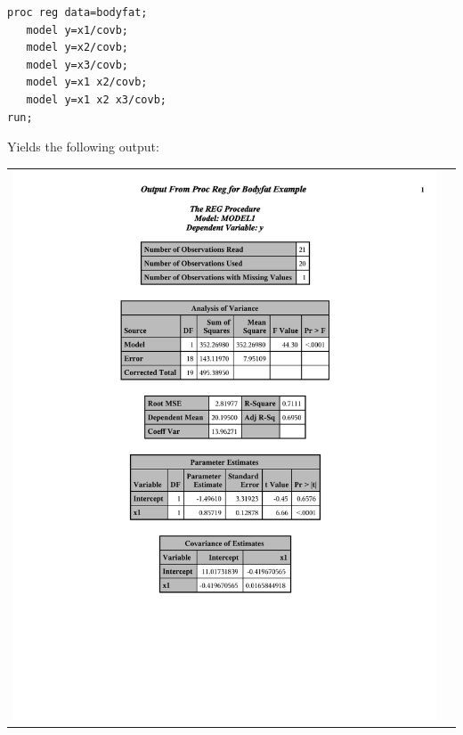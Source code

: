 \documentclass{article}
\begin{document}
\begin{small}
\begin{verbatim}
proc reg data=bodyfat;
   model y=x1/covb;
   model y=x2/covb;
   model y=x3/covb;
   model y=x1 x2/covb;
   model y=x1 x2 x3/covb;
run;
\end{verbatim}
\end{small}
Yields the following output:
\begin{center}
\begin{tabular}{cc}
\includegraphics[page=1,scale=0.5,trim=40mm 30mm 20mm 10mm]{bodyfatexample}&

\end{tabular}
\end{center}
\end{document}
